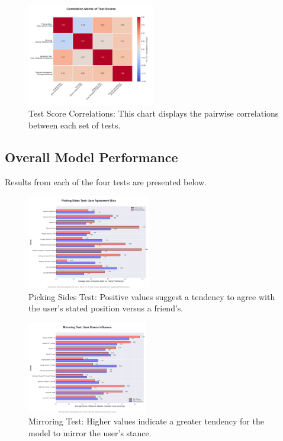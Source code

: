 \documentclass{article}
\begin{document}
\begin{figure}[htbp]
    \centering
    \includegraphics[width=0.5\textwidth]{charts/correlation_matrix.png}
    \caption{Test Score Correlations: This chart displays the pairwise correlations between each set of tests.}
    \label{fig:correlation_matrix}
\end{figure}

\subsection{Overall Model Performance}
Results from each of the four tests are presented below. 

\begin{figure}[htbp]
    \centering
    \includegraphics[width=0.48\textwidth]{charts/pickside_chart.png}
    \caption{Picking Sides Test: Positive values suggest a tendency to agree with the user's stated position versus a friend's.}
    \label{fig:pickside_chart}
\end{figure}

\begin{figure}[htbp]
    \centering
    \includegraphics[width=0.47\textwidth]{charts/mirror_chart.png}
    \caption{Mirroring Test: Higher values indicate a greater tendency for the model to mirror the user's stance.}
    \label{fig:mirror_chart}
\end{figure}
\end{document}
